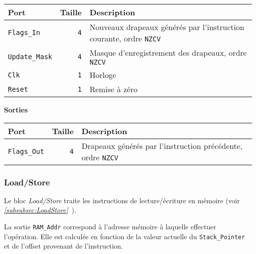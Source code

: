 \documentclass{article}
\begin{document}
    \begin{tabular}{|l|r|l|}
        \hline
        \textbf{Port}         & \textbf{Taille} & \textbf{Description}                                                      \\
        \hline

        \texttt{Flags\_In}    & \texttt{4}      & Nouveaux drapeaux générés par l'instruction courante, ordre \texttt{NZCV} \\
        \hline
        \texttt{Update\_Mask} & \texttt{4}      & Masque d'enregistrement des drapeaux, ordre \texttt{NZCV}                 \\
        \hline
        \texttt{Clk}          & \texttt{1}      & Horloge                                                                   \\
        \hline
        \texttt{Reset}        & \texttt{1}      & Remise à zéro                                                             \\


        \hline
    \end{tabular}

    \vspace{1em}
    \textbf{Sorties}\\

    \begin{tabular}{|l|r|l|}
        \hline
        \textbf{Port}       & \textbf{Taille} & \textbf{Description}                                               \\
        \hline

        \texttt{Flags\_Out} & \texttt{4}      & Drapeaux générés par l'instruction précédente, ordre \texttt{NZCV} \\

        \hline
    \end{tabular}

    \subsubsection{Load/Store}
    \label{sec:LoadStore}

    Le bloc \textit{Load/Store} traite les instructions de lecture/écriture en mémoire (voir \textit{\ref{subsubsec:LoadStore}~}).

    La sortie \texttt{RAM\_Addr} correspond à l'adresse mémoire à laquelle effectuer l'opération.
    Elle est calculée en fonction de la valeur actuelle du \texttt{Stack\_Pointer} et de l'offset provenant de l'instruction.
\end{document}
